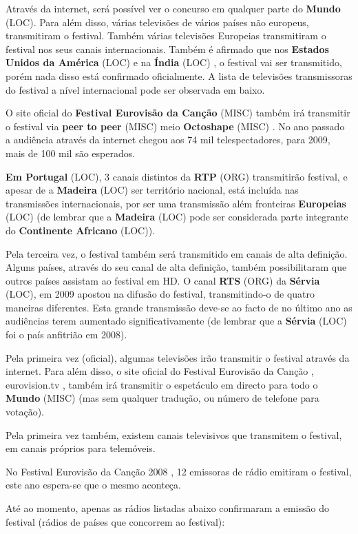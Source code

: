\documentclass[12pt,a4paper]{article}
\begin{document}
Através da internet, será possível ver o concurso em qualquer parte do \textbf{Mundo} (LOC). Para além disso, várias televisões de vários países não europeus, transmitiram o festival. Também várias televisões Europeias transmitiram o festival nos seus canais internacionais. Também é afirmado que nos \textbf{Estados Unidos da América} (LOC) e na \textbf{Índia} (LOC) , o festival vai ser transmitido, porém nada disso está confirmado oficialmente. A lista de televisões transmissoras do festival a nível internacional pode ser observada em baixo.

O site oficial do \textbf{Festival Eurovisão da Canção} (MISC) também irá transmitir o festival via \textbf{peer to peer} (MISC) meio \textbf{Octoshape} (MISC) . No ano passado a audiência através da internet chegou aos 74 mil telespectadores, para 2009, mais de 100 mil são esperados.

\textbf{Em Portugal} (LOC), 3 canais distintos da \textbf{RTP} (ORG) transmitirão festival, e apesar de a \textbf{Madeira} (LOC) ser território nacional, está incluída nas transmissões internacionais, por ser uma transmissão além fronteiras \textbf{Europeias} (LOC) (de lembrar que a \textbf{Madeira} (LOC) pode ser considerada parte integrante do \textbf{Continente Africano} (LOC)).

Pela terceira vez, o festival também será transmitido em canais de alta definição. Alguns países, através do seu canal de alta definição, também possibilitaram que outros países assistam ao festival em HD. O canal \textbf{RTS} (ORG) da \textbf{Sérvia} (LOC), em 2009 apostou na difusão do festival, transmitindo-o de quatro maneiras diferentes. Esta grande transmissão deve-se ao facto de no último ano as audiências terem aumentado significativamente (de lembrar que a \textbf{Sérvia} (LOC) foi o país anfitrião em 2008).

Pela primeira vez (oficial), algumas televisões irão transmitir o festival através da internet. Para além disso, o site oficial do Festival Eurovisão da Canção , eurovision.tv , também irá transmitir o espetáculo em directo para todo o \textbf{Mundo} (MISC) (mas sem qualquer tradução, ou número de telefone para votação).

Pela primeira vez também, existem canais televisivos que transmitem o festival, em canais próprios para telemóveis.

No Festival Eurovisão da Canção 2008 , 12 emissoras de rádio emitiram o festival, este ano espera-se que o mesmo aconteça.

Até ao momento, apenas as rádios listadas abaixo confirmaram a emissão do festival (rádios de países que concorrem ao festival):
\end{document}
